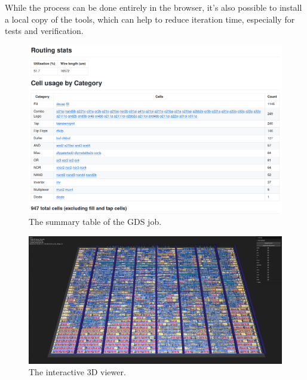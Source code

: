 While the process can be done entirely in the browser, it’s also possible to install a local copy of the tools, which can help to reduce iteration time, especially for tests and verification.

\begin{figure}[htp]
\centering
\includegraphics[width=\columnwidth]{./Figs/gh action cell stats.png}
\caption{The summary table of the GDS job.}
\label{fig:summary_table_GDS_job}
\end{figure}

\begin{figure}[htp]
\centering
\includegraphics[width=\columnwidth]{./Figs/gh action gds 3d view.png}
\caption{The interactive 3D viewer.}
\label{fig:interactive_3D_viewer}
\end{figure}
